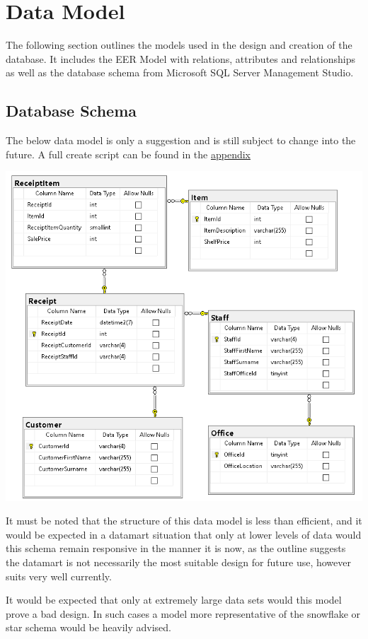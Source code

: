 \documentclass{article}
\begin{document}

\newpage

    \section{Data Model}
    
    	The following section outlines the models used in the design and creation of the database. It includes the EER Model with relations, attributes and relationships as well as the database schema from Microsoft SQL Server Management Studio.
    
        \subsection{Database Schema}
            The below data model is only a suggestion and is still subject to change into the future. A full create script can be found in the \hyperref[sec:Appendix]{\color{blue}appendix}
                \begin{center}
                    \includegraphics[width=\textwidth,keepaspectratio]{Images/schema.PNG}
                \end{center}
            It must be noted that the structure of this data model is 
            less than efficient, and it would be expected in a datamart
            situation that only at lower levels of data would this schema
            remain responsive in the manner it is now, as the outline
            suggests the datamart is not necessarily the most suitable
            design for future use, however suits very well currently.
            \par
            It would be expected that only at extremely large data sets
            would this model prove a bad design. In such cases a model 
            more representative of the snowflake or star schema would be
            heavily advised.
\end{document}
